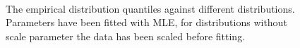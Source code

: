 \documentclass[11pt]{article}
\begin{document}
\begin{figure}[H]
\centering
{} 
\\
\caption{The empirical distribution quantiles against different distributions. Parameters have been fitted with MLE, for distributions without scale parameter the data has been scaled before fitting.}
\label{fig:part1:qq_plots}
\end{figure}
\end{document}
